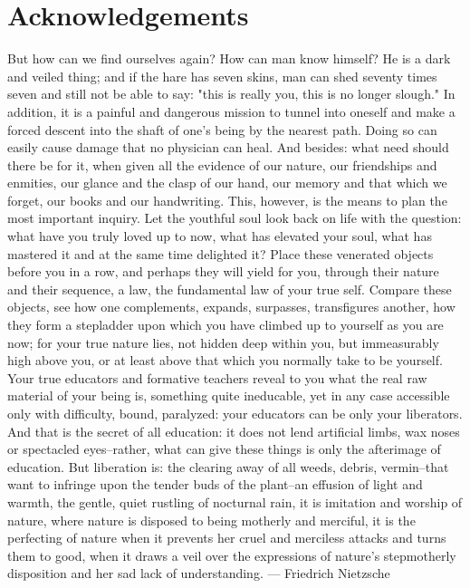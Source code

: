 \chapter*{Acknowledgements}

But how can we find ourselves again? How can man know himself? He is a dark and veiled thing; and if the hare has seven skins, man can shed seventy times seven and still not be able to say: "this is really you, this is no longer slough." In addition, it is a painful and dangerous mission to tunnel into oneself and make a forced descent into the shaft of one's being by the nearest path. Doing so can easily cause damage that no physician can heal. And besides: what need should there be for it, when given all the evidence of our nature, our friendships and enmities, our glance and the clasp of our hand, our memory and that which we forget, our books and our handwriting. This, however, is the means to plan the most important inquiry. Let the youthful soul look back on life with the question: what have you truly loved up to now, what has elevated your soul, what has mastered it and at the same time delighted it? Place these venerated objects before you in a row, and perhaps they will yield for you, through their nature and their sequence, a law, the fundamental law of your true self. Compare these objects, see how one complements, expands, surpasses, transfigures another, how they form a stepladder upon which you have climbed up to yourself as you are now; for your true nature lies, not hidden deep within you, but immeasurably high above you, or at least above that which you normally take to be yourself. Your true educators and formative teachers reveal to you what the real raw material of your being is, something quite ineducable, yet in any case accessible only with difficulty, bound, paralyzed: your educators can be only your liberators. And that is the secret of all education: it does not lend artificial limbs, wax noses or spectacled eyes--rather, what can give these things is only the afterimage of education. But liberation is: the clearing away of all weeds, debris, vermin--that want to infringe upon the tender buds of the plant--an effusion of light and warmth, the gentle, quiet rustling of nocturnal rain, it is imitation and worship of nature, where nature is disposed to being motherly and merciful, it is the perfecting of nature when it prevents her cruel and merciless attacks and turns them to good, when it draws a veil over the expressions of nature's stepmotherly disposition and her sad lack of understanding. — Friedrich Nietzsche